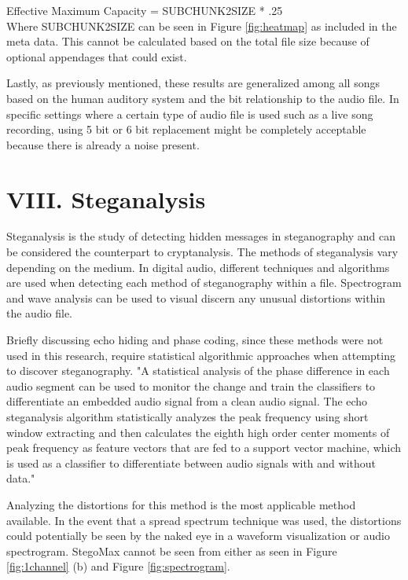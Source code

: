 \documentclass[letterpaper]{article}
\begin{document}
Effective Maximum Capacity = SUBCHUNK2SIZE * .25\\

Where SUBCHUNK2SIZE can be seen in Figure \ref{fig:heatmap} as included in the meta data. This cannot be calculated based on the total file size because of optional appendages that could exist. 


Lastly, as previously mentioned, these results are generalized among all songs based on the human auditory system and the bit relationship to the audio file. In specific settings where a certain type of audio file is used such as a live song recording, using 5 bit or 6 bit replacement might be completely acceptable because there is already a noise present.




\section{VIII. Steganalysis}
Steganalysis is the study of detecting hidden messages in steganography and can be considered the counterpart to cryptanalysis. The methods of steganalysis vary depending on the medium. In digital audio, different techniques and algorithms are used when detecting each method of steganography within a file. Spectrogram and wave analysis can be used to visual discern any unusual distortions within the audio file. 

Briefly discussing echo hiding and phase coding, since these methods were not used in this research, require statistical algorithmic approaches when attempting to discover steganography. "A statistical analysis of the phase difference in each audio segment can be used to monitor the change and train the classifiers to differentiate an embedded audio signal from a clean audio signal. The echo steganalysis algorithm statistically analyzes the peak frequency using short window extracting and then calculates the eighth high order center moments of peak frequency as feature vectors that are fed to a support vector machine, which is used as a classifier to differentiate between audio signals with and without data." \cite{meghanathan2010steganalysis}

Analyzing the distortions for this method is the most applicable method available. In the event that a spread spectrum technique was used, the distortions could potentially be seen by the naked eye in a waveform visualization or audio spectrogram. StegoMax cannot be seen from either as seen in Figure \ref{fig:1channel} (b) and Figure \ref{fig:spectrogram}. 
\end{document}
